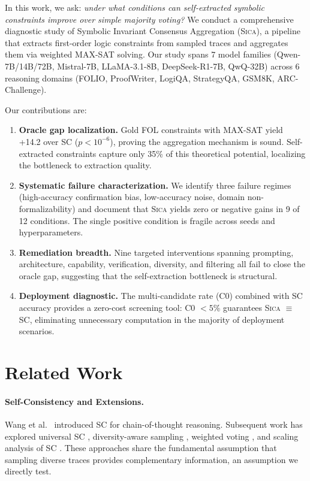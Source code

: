 \documentclass[11pt,a4paper]{article}
\newcommand{\sica}{\textsc{Sica}}
\newcommand{\pp}{\text{pp}}
\begin{document}
In this work, we ask: \emph{under what conditions can self-extracted symbolic constraints improve over simple majority voting?}
We conduct a comprehensive diagnostic study of Symbolic Invariant Consensus Aggregation (\sica{}), a pipeline that extracts first-order logic constraints from sampled traces and aggregates them via weighted MAX-SAT solving.
Our study spans 7 model families (Qwen-7B/14B/72B, Mistral-7B, LLaMA-3.1-8B, DeepSeek-R1-7B, QwQ-32B) across 6 reasoning domains (FOLIO, ProofWriter, LogiQA, StrategyQA, GSM8K, ARC-Challenge).

Our contributions are:
\begin{enumerate}
\item \textbf{Oracle gap localization.} Gold FOL constraints with MAX-SAT yield +14.2\pp{} over SC ($p < 10^{-6}$), proving the aggregation mechanism is sound. Self-extracted constraints capture only 35\% of this theoretical potential, localizing the bottleneck to extraction quality.
\item \textbf{Systematic failure characterization.} We identify three failure regimes (high-accuracy confirmation bias, low-accuracy noise, domain non-formalizability) and document that \sica{} yields zero or negative gains in 9 of 12 conditions. The single positive condition is fragile across seeds and hyperparameters.
\item \textbf{Remediation breadth.} Nine targeted interventions spanning prompting, architecture, capability, verification, diversity, and filtering all fail to close the oracle gap, suggesting that the self-extraction bottleneck is structural.
\item \textbf{Deployment diagnostic.} The multi-candidate rate (C0) combined with SC accuracy provides a zero-cost screening tool: C0 $< 5\%$ guarantees \sica{} $\equiv$ SC, eliminating unnecessary computation in the majority of deployment scenarios.
\end{enumerate}

\section{Related Work}

\paragraph{Self-Consistency and Extensions.}
Wang et al.~\citeyearpar{wang2023selfconsistency} introduced SC for chain-of-thought reasoning.
Subsequent work has explored universal SC \citep{chen2023usc}, diversity-aware sampling \citep{li2023diverse}, weighted voting \citep{taubenfeld2025weighted}, and scaling analysis of SC \citep{loo2025sc}.
These approaches share the fundamental assumption that sampling diverse traces provides complementary information, an assumption we directly test.
\end{document}
